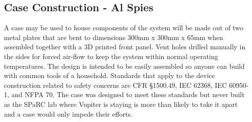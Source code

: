 \documentclass[15pt]{article}
\begin{document}
\subsection{Case Construction - Al Spies}
A case may be used to house components of the system will be made out of two metal plates that are bent to dimensions 300mm x 300mm x 65mm when assembled together with a 3D printed front panel. Vent holes drilled manually in the sides for forced air-flow to keep the system within normal operating temperatures. The design is intended to be easily assembled so anyone can build with common tools of a household. Standards that apply to the device construction related to safety concerns are CFR §1500.49, IEC 62368, IEC 60950-1, and NFPA 70. The case was designed to meet these standards but never built as the SPaRC lab where Vupiter is staying is more than likely to take it apart and a case would only impede their efforts.
\pagebreak
\end{document}

